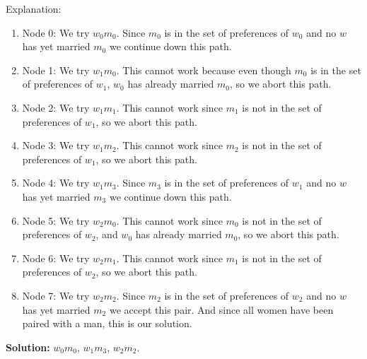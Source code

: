 \documentclass[a4paper, 12pt]{article}
\begin{document}
Explanation:
\begin{enumerate}
\item
Node 0: We try $w_0m_0$. Since $m_0$ is in the set of preferences of $w_0$ and no $w$ has yet married $m_0$ we continue down this path.
\item
Node 1: We try $w_1m_0$. This cannot work because even though $m_0$ is in the set of preferences of $w_1$, $w_0$ has already married $m_0$, so we abort this path.
\item
Node 2: We try $w_1m_1$. This cannot work since $m_1$ is not in the set of preferences of $w_1$, so we abort this path.
\item
Node 3: We try $w_1m_2$. This cannot work since $m_2$ is not in the set of preferences of $w_1$, so we abort this path.
\item
Node 4: We try $w_1m_3$. Since $m_3$ is in the set of preferences of $w_1$ and no $w$ has yet married $m_3$ we continue down this path.
\item
Node 5: We try $w_2m_0$. This cannot work since $m_0$ is not in the set of preferences of $w_2$, and $w_0$ has already married $m_0$, so we abort this path.
\item
Node 6: We try $w_2m_1$. This cannot work since $m_1$ is not in the set of preferences of $w_2$, so we abort this path.
\item
Node 7: We try $w_2m_2$. Since $m_2$ is in the set of preferences of $w_2$ and no $w$ has yet married $m_2$ we accept this pair. And since all women have been paired with a man, this is our solution.
\end{enumerate}

\textbf{Solution:} $w_0m_0$, $w_1m_3$, $w_2m_2$.
\end{document}

